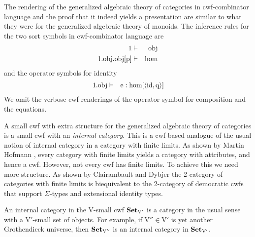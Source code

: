 \documentclass{mscs}
\newcommand{\FYI}[1]{{#1}}
\def\V{\mathrm{V}}
\def\Obj{\mathrm{obj}}
\def\Hom{\mathrm{hom}}
\def\id{\mathrm{id}}
\def\idmon{\mathrm{e}}
\begin{document}
The rendering of the generalized algebraic theory of categories in cwf-combinator language and the proof that it indeed yields a \FYI{presentation} are similar to what they were for the generalized algebraic theory of monoids. The inference rules for the two sort symbols in cwf-combinator language are
\begin{eqnarray*}
1 &\vdash& \Obj\\
1.\Obj.\Obj[\p] &\vdash& \Hom
\end{eqnarray*}
and the operator symbols for identity
\begin{eqnarray*}
1.\Obj &\vdash& \idmon : \Hom[\tuple{\id,\q}]
\end{eqnarray*}
We omit the verbose cwf-renderings of the operator symbol for composition and the equations.

A small cwf with extra structure for the generalized algebraic theory of categories is a small cwf with an {\em internal category}. This is a cwf-based analogue of the usual notion of internal category in a category with finite limits. As shown by Martin Hofmann \cite{hofmann:csl,hofmann:cambridge}, every category with finite limits yields a category with attributes, and hence a cwf. However, not every cwf has finite limits. To achieve this we need more structure. As shown by Clairambault and Dybjer \cite{ClairambaultD11,ClairambaultD14} the 2-category of categories with finite limits is biequivalent to the 2-category of democratic cwfs that support $\Sigma$-types and extensional identity types.

An internal category in the $\V$-small cwf $\Set_{\V'}$ is a category in the usual sense with a $\V'$-small set of objects. For example, if $\V'' \in \V'$ is yet another Grothendieck universe, then $\Set_{\V''}$ is an internal category in $\Set_{\V'}$.

\end{document}
